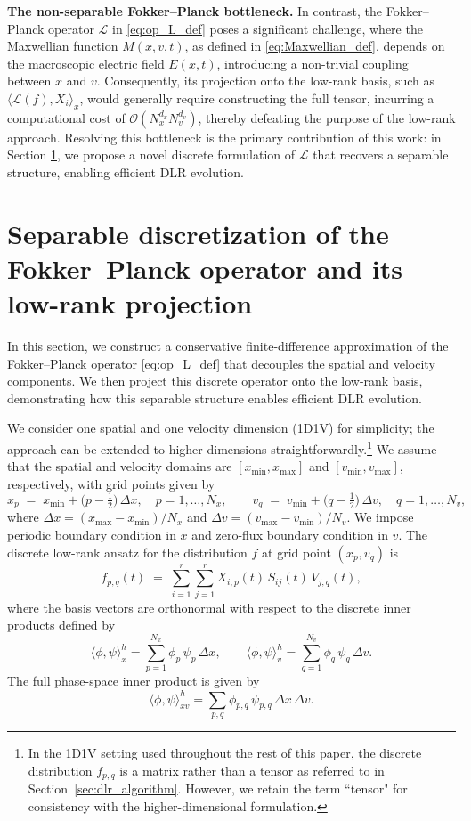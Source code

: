 \documentclass[]{article}
\numberwithin{equation}{section}
\newcommand{\modifysecond}[1]{#1}
\begin{document}
\medskip
\noindent\textbf{The non-separable Fokker--Planck bottleneck.}
In contrast, the Fokker--Planck operator $\mathcal{L}$ in \eqref{eq:op_L_def} poses a significant challenge, where the Maxwellian function $M(x,v,t)$, as defined in \eqref{eq:Maxwellian_def}, depends on the macroscopic electric field $E(x,t)$, introducing a non-trivial coupling between $x$ and $v$. Consequently, its projection onto the low-rank basis, such as $\langle \mathcal{L}(f), X_i \rangle_x$, would generally require constructing the full tensor, incurring a computational cost of $\mathcal{O}(N_x^{d_x} N_v^{d_v})$, thereby defeating the purpose of the low-rank approach. Resolving this bottleneck is the primary contribution of this work: in Section \ref{sec:discretization}, we propose a novel discrete formulation of $\mathcal{L}$ that recovers a separable structure, enabling efficient DLR evolution.


\section{Separable discretization of the Fokker--Planck operator and its low-rank projection}
\label{sec:discretization}

In this section, we construct a conservative finite-difference approximation of the Fokker--Planck operator \eqref{eq:op_L_def} that 
decouples the spatial and velocity components. We then project this discrete operator onto the low-rank basis, demonstrating how this separable structure enables efficient DLR evolution.

We consider one spatial and one velocity dimension (1D1V) for simplicity; the approach can be extended to higher dimensions straightforwardly.\footnote{\modifysecond{In the 1D1V setting used throughout the rest of this paper, the discrete distribution $f_{p,q}$ is a matrix rather than a tensor as referred to in Section~\ref{sec:dlr_algorithm}. However, we retain the term ``tensor" for consistency with the higher-dimensional formulation.}} We assume that the spatial and velocity domains are $[x_{\min},x_{\max}]$ and $[v_{\min},v_{\max}]$, respectively, with grid points 
given by
\[
  x_p \;=\; x_{\min} + \Big(p-\tfrac{1}{2}\Big)\,\Delta x, \quad p=1,\dots,N_x,
  \qquad
  v_q \;=\; v_{\min} + \Big(q-\tfrac{1}{2}\Big)\,\Delta v, \quad q=1,\dots,N_v,
\]
where $\Delta x=(x_{\max}-x_{\min})/N_x$ and $\Delta v=(v_{\max}-v_{\min})/N_v$.
We impose periodic boundary condition in \(x\) and zero-flux boundary condition in \(v\). The discrete low-rank ansatz for the distribution \(f\) at grid point \((x_p,v_q)\) is
\begin{equation}\label{eq:lr_ansatz_grid}
  f_{p,q}(t) \;=\; \sum_{i=1}^r \sum_{j=1}^r X_{i,p}(t)\,S_{ij}(t)\,V_{j,q}(t),
\end{equation}
where the basis vectors are orthonormal with respect to the discrete inner products defined by
\[
  \langle \phi, \psi \rangle_x^h = \sum_{p=1}^{N_x} \phi_p\,\psi_p\,\Delta x,
  \qquad
  \langle \phi, \psi \rangle_v^h = \sum_{q=1}^{N_v} \phi_q\,\psi_q\,\Delta v.
\]
The full phase-space inner product is given by \[\langle \phi, \psi \rangle_{xv}^h = \sum_{p,q} \phi_{p,q}\,\psi_{p,q}\,\Delta x\,\Delta v.\]
\end{document}
